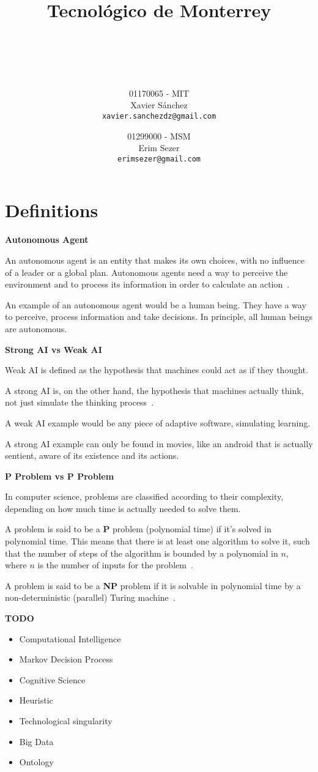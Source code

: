 \documentclass[titlepage, letterpaper, fleqn]{article}
\title{
    \vspace{1in}
    \textbf{Tecnológico de Monterrey} \\
    \vspace{0.5in}
    \textmd{\mahclass} \\
    \large{\textit{\mahteacher}} \\
    \vspace{0.5in}
    \textsc{\mahtitle}
    \author{01170065  - MIT \\
    Xavier Sánchez \\
    \texttt{xavier.sanchezdz@gmail.com}
    \and
    01299000 - MSM \\
    Erim Sezer \\
    \texttt{erimsezer@gmail.com}
    }
    \date{\mahdate}
}
\newcommand{\spacepls}{\vspace{5mm}}
\newcommand{\defy}[1]{
	\textbf{#1} %
}
\newcommand{\defys}[1]{
	\spacepls %
	\textbf{#1}
}
\begin{document}
\begin{titlepage}
\maketitle
\end{titlepage}

%
%

\section{Definitions}
\label{sec:defs}

\defy{Autonomous Agent}

An autonomous agent is an entity that makes its own choices, with no influence of a leader or a global plan.
Autonomous agents need a way to perceive the environment and to process its information in order to calculate an action~\cite{Shiffman}.

An example of an autonomous agent would be a human being. They have a way to perceive, process information and take decisions. In principle, all human beings are autonomous.

\defys{Strong AI vs Weak AI}

Weak AI is defined as the hypothesis that machines could act as if they thought.

A strong AI is, on the other hand, the hypothesis that machines actually think, not just simulate the thinking process~\cite{StrongAI}.

A weak AI example would be any piece of adaptive software, simulating learning.

A strong AI example can only be found in movies, like an android that is actually sentient, aware of its existence and its actions.

\defys{P Problem vs P Problem}

In computer science, problems are classified according to their complexity, depending on how much time is actually needed to solve them.

A problem is said to be a \textbf{P} problem (polynomial time) if it's solved in polynomial time. This means that there is at least one algorithm to solve it, such that the number of steps of the algorithm is bounded by a polynomial in \(n\), where \(n\) is the number of inputs for the problem~\cite{PProblem}.

A problem is said to be a \textbf{NP} problem if it is solvable in polynomial time by a non-deterministic (parallel) Turing machine~\cite{NPProblem}.

\textbf{TODO}

\begin{itemize}
	\item Computational Intelligence
	\item Markov Decision Process
	\item Cognitive Science
	\item Heuristic
	\item Technological singularity
	\item Big Data
	\item Ontology
\end{itemize}


\end{document}
